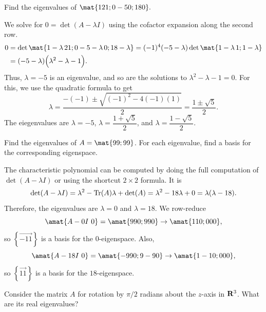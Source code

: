 \begin{problems}
\ifanswers \newpage \fi 

\problem %
Find the eigenvalues of 
$\mat{1 2 1; 0 -5 0; 1 8 0}.$

\begin{solution}
We solve for $0 = \det(A-\lambda I)$ using the cofactor expansion
along the second row.
\begin{align*}
0 & = \det \mat{1-\lambda \, 2 1; 0 -5-\lambda \, 0; 1 8 -\lambda}
= (-1)^{4}(-5-\lambda) \det\mat{1-\lambda \, 1; 1 -\lambda}
\\ &
= (-5-\lambda)\Big(\lambda^2-\lambda-1\Big).
\end{align*}
Thus, $\lambda = -5$ is an eigenvalue, and so are the solutions to $\lambda^2-\lambda -1 = 0$.  For this, we use the quadratic formula to get
\[\lambda = \frac{-(-1) \pm \sqrt{(-1)^2-4(-1)(1)}}{2}
= \frac{1 \pm \sqrt{5}}{2}.\]
The eiegenvalues are $\lambda = -5$,
$\lambda = \dfrac{1 + \sqrt{5}}{2}$, and 
$\lambda = \dfrac{1 - \sqrt{5}}{2}$.
\end{solution}

\problem
Find the eigenvalues of $A = \mat{9 9; 9 9}$.  For each eigenvalue, find
a basis for the corresponding eigenspace.

\begin{solution}
  The characteristic polynomial can be computed by doing the full computation
  of $\det(A- \lambda I)$ or using the shortcut $2 \times 2$ formula.  It is
  \[\det(A-\lambda I) = \lambda^2 - \textup{Tr}(A) \lambda + \det(A)
    = \lambda^2 - 18 \lambda + 0 = \lambda(\lambda-18).\] Therefore,
  the eigenvalues are $\lambda = 0$ and $\lambda = 18$.  We row-reduce
  \[\amat{A-0I \ 0}= \amat{9 9 0; 9 9 0} \to \amat{1 1 0; 0 0 0},\]
  so $\left\{\vec{-1 1}\right\}$ is a basis for the $0$-eigenspace.
  Also,
  \[\amat{A-18I \ 0}= \amat{-9 9 0; 9 -9 0} \to \amat{1 -1 0; 0 0 0},\]
  so $\left\{\vec{1 1}\right\}$ is a basis for the $18$-eigenspace.
  
\end{solution}

\ifanswers \newpage \fi 

\problem %
Consider the matrix $A$ for rotation by $\pi/2$ radians about the $z$-axis in
${\bf R}^3$. What are its real eigenvalues?


\end{problems}
